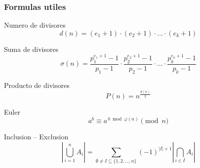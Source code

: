 \subsubsection{Formulas utiles}
Numero de divisores
\[
d(n) = (e_1 + 1) \cdot (e_2 + 1) \cdot \dots \cdot (e_k + 1)
\]

Suma de divisores
\[
\sigma(n) = \frac{p_1^{e_1 + 1} - 1}{p_1 - 1} \cdot
\frac{p_2^{e_2 + 1} - 1}{p_2 - 1} \cdot
\dots \cdot
\frac{p_k^{e_k + 1} - 1}{p_k - 1}
\]

Producto de divisores
\[
P(n) = n^{\frac{d(n)}{2}}
\]

Euler
\[
a^b \equiv a^{\,b \bmod \varphi(n)} \pmod{n}
\]

Inclusion -- Exclusion
\[
\left| \bigcup_{i=1}^{n} A_i \right|
= \sum_{\emptyset \neq I \subseteq \{1,2,\dots,n\}} (-1)^{|I|+1}
\left| \bigcap_{i \in I} A_i \right|
\]
